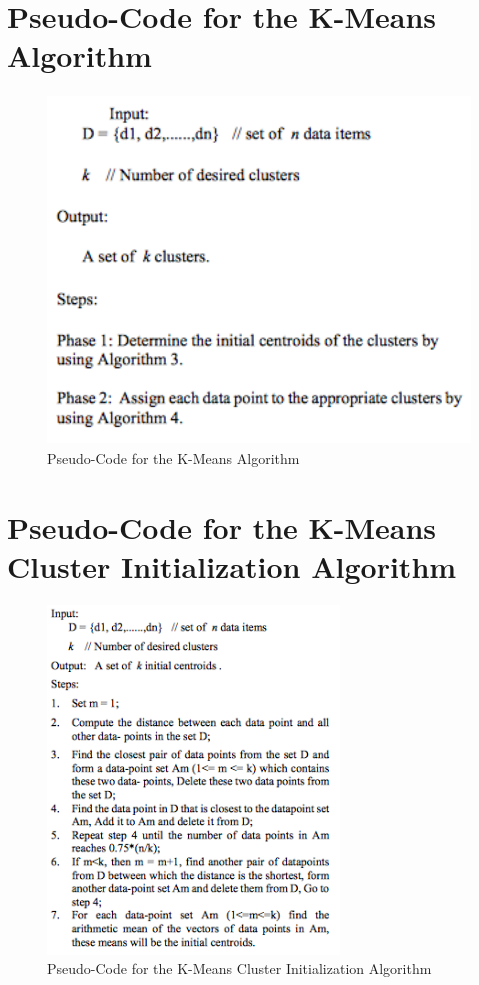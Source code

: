 \documentclass[12pt]{article}
\begin{document}
\newpage
\appendix
\appendixpage
\addappheadtotoc

\section{Pseudo-Code for the K-Means Algorithm}
\label{appendix:kmeans}
\begin{figure}[!htb]
\begin{center}
	\includegraphics[height=25em]{kmeans.png}
	\caption{Pseudo-Code for the K-Means Algorithm}
	\label{uml}
\end{center}
\end{figure}

\newpage
\section{Pseudo-Code for the K-Means Cluster Initialization Algorithm}
\label{appendix:kmeansinit}
\begin{figure}[!htb]
\begin{center}
	\includegraphics[height=25em]{kmeans_init.png}
	\caption{Pseudo-Code for the K-Means Cluster Initialization Algorithm}
	\label{uml}
\end{center}
\end{figure}
\end{document}
